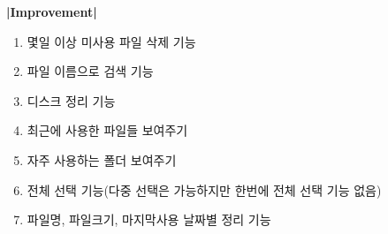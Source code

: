 \documentclass[a4paper, 13pt]{article} %
\begin{document}
		\newpage
		
		\bf \LARGE |Improvement| \newline
		
		\begin{enumerate}
		
		\large \item 몇일 이상 미사용 파일 삭제 기능 \newline
		
		\item 파일 이름으로 검색 기능 \newline
		
		\item 디스크 정리 기능 \newline
		
		\item 최근에 사용한 파일들 보여주기 \newline
		
		\item 자주 사용하는 폴더 보여주기 \newline
		
		\item 전체 선택 기능(다중 선택은 가능하지만 한번에 전체 선택 기능 없음) \newline
		
		\item 파일명, 파일크기, 마지막사용 날짜별 정리 기능
		\end{enumerate}
\end{document}
